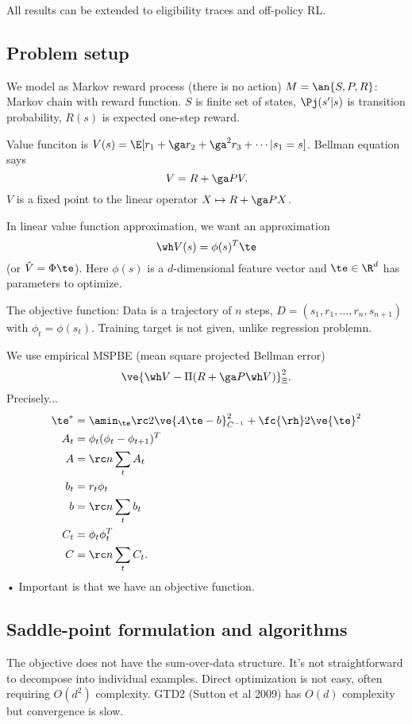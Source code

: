 All results can be extended to eligibility traces and off-policy RL.

\subsection{Problem setup}

We model as Markov reward process (there is no action) $M=\an{S,P,R}$: Markov chain with reward function. $S$ is finite set of states, $\Pj(s'|s)$ is transition probability, $R(s)$ is expected one-step reward.

Value funciton is $V(s) = \E[r_1+\ga r_2+\ga^2r_3+\cdots|s_1=s]$. Bellman equation says
$$
V=R+\ga PV.
$$
$V$ is a fixed point to the linear operator $X\mapsto R+\ga PX$.

In linear value function approximation, we want an approximation
$$
\wh V(s) = \phi(s)^T \te
$$
(or $\hat V = \Phi\te$). Here $\phi(s)$ is a $d$-dimensional feature vector and $\te\in \R^d$ has parameters to optimize.
 
 The objective function: Data is a trajectory of $n$ steps, $D=(s_1,r_1,\ldots, r_n,s_{n+1})$ with $\phi_t=\phi(s_t)$. Training target is not given, unlike regression problemn.
 
 We use empirical MSPBE (mean square projected Bellman error)
$$
\ve{\wh V - \Pi (R+\ga P\wh V)}_{\Xi}^2.
$$
Precisely...
\begin{align}
\te^* &= \amin_\te \rc 2 \ve{A\te - b}_{C^{-1}}^2 + \fc{\rh}2\ve{\te}^2\\
A_t &= \phi_t(\phi_t-\phi_{t+1})^T\\
A &= \rc n \sum_t A_t\\
b_t&=r_t\phi_t\\
b&=\rc n\sum_t b_t\\
C_t &= \phi_t\phi_t^T\\
C&=\rc n \sum_t C_t.
\end{align}•
Important is that we have an objective function.


\subsection{Saddle-point formulation and algorithms}

The objective does not have the sum-over-data structure. It's not straightforward to decompose into individual examples. Direct optimization is not easy, often requiring $O(d^2)$ complexity. 
GTD2 (Sutton et al 2009) has $O(d)$ complexity but convergence is slow.

